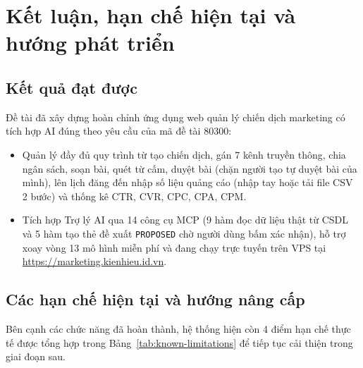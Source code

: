\section{Kết luận, hạn chế hiện tại và hướng phát triển}

\subsection{Kết quả đạt được}
Đề tài đã xây dựng hoàn chỉnh ứng dụng web quản lý chiến dịch marketing có tích hợp AI đúng theo yêu cầu của mã đề tài 80300:
\begin{itemize}[noitemsep,topsep=2pt]
 \item Quản lý đầy đủ quy trình từ tạo chiến dịch, gán 7 kênh truyền thông, chia ngân sách, soạn bài, quét từ cấm, duyệt bài (chặn người tạo tự duyệt bài của mình), lên lịch đăng đến nhập số liệu quảng cáo (nhập tay hoặc tải file CSV 2 bước) và thống kê CTR, CVR, CPC, CPA, CPM.
 \item Tích hợp Trợ lý AI qua 14 công cụ MCP (9 hàm đọc dữ liệu thật từ CSDL và 5 hàm tạo thẻ đề xuất \texttt{PROPOSED} chờ người dùng bấm xác nhận), hỗ trợ xoay vòng 13 mô hình miễn phí và đang chạy trực tuyến trên VPS tại \url{https://marketing.kienhieu.id.vn}.
\end{itemize}

\subsection{Các hạn chế hiện tại và hướng nâng cấp}

Bên cạnh các chức năng đã hoàn thành, hệ thống hiện còn 4 điểm hạn chế thực tế được tổng hợp trong Bảng~\ref{tab:known-limitations} để tiếp tục cải thiện trong giai đoạn sau.

